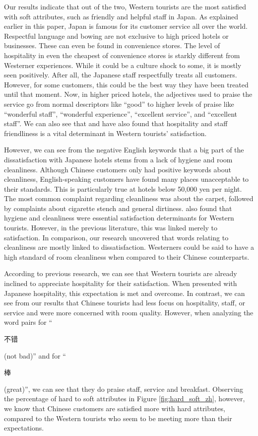 \documentclass[smallextended,natbib]{svjour3}       %
\begin{document}
    Our results indicate that out of the two, Western tourists are the most satisfied with soft attributes, such as friendly and helpful staff in Japan. As explained earlier in this paper, Japan is famous for its customer service all over the world. Respectful language and bowing are not exclusive to high priced hotels or businesses. These can even be found in convenience stores. The level of hospitality in even the cheapest of convenience stores is starkly different from Westerner experiences. While it could be a culture shock to some, it is mostly seen positively. After all, the Japanese staff respectfully treats all customers. However, for some customers, this could be the best way they have been treated until that moment. Now, in higher priced hotels, the adjectives used to praise the service go from normal descriptors like ``good'' to higher levels of praise like ``wonderful staff'', ``wonderful experience'', ``excellent service'', and ``excellent staff''. We can also see that \cite{kozak2002} and \cite{shanka2004} have also found that hospitality and staff friendliness is a vital determinant in Western tourists' satisfaction.

    However, we can see from the negative English keywords that a big part of the dissatisfaction with Japanese hotels stems from a lack of hygiene and room cleanliness. Although Chinese customers only had positive keywords about cleanliness, English-speaking customers have found many places unacceptable to their standards. This is particularly true at hotels below 50,000 yen per night. The most common complaint regarding cleanliness was about the carpet, followed by complaints about cigarette stench and general dirtiness. \cite{kozak2002} also found that hygiene and cleanliness were essential satisfaction determinants for Western tourists. However, in the previous literature, this was linked merely to satisfaction. In comparison, our research uncovered that words relating to cleanliness are mostly linked to dissatisfaction. Westerners could be said to have a high standard of room cleanliness when compared to their Chinese counterparts.

    According to previous research, we can see that Western tourists are already inclined to appreciate hospitality for their satisfaction. When presented with Japanese hospitality, this expectation is met and overcome. In contrast, we can see from our results that Chinese tourists had less focus on hospitality, staff, or service and were more concerned with room quality. However, when analyzing the word pairs for ``\begin{CJK}{UTF8}{gbsn}不错\end{CJK} (not bad)'' and for ``\begin{CJK}{UTF8}{gbsn}棒\end{CJK} (great)'', we can see that they do praise staff, service and breakfast. Observing the percentage of hard to soft attributes in Figure \ref{fig:hard_soft_zh}, however, we know that Chinese customers are satisfied more with hard attributes, compared to the Western tourists who seem to be meeting more than their expectations.
\end{document}
